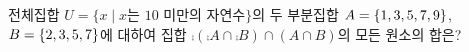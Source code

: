전체집합 $U=\{x \mid x$는 $10$ 미만의 자연수$\}$의 두 부분집합 $A=\{1{,}\mkern3mu\mathopen{}3{,}\mkern3mu\mathopen{}5{,}\mkern3mu\mathopen{}7{,}\mkern3mu\mathopen{}9\}$, $B=\{2{,}\mkern3mu\mathopen{}3{,}\mkern3mu\mathopen{}5{,}\mkern3mu\mathopen{}7\}$에 대하여 집합 $\comp{(\comp{A}\cap\comp{B})}\cap(A\cap B)$의 모든 원소의 합은?
